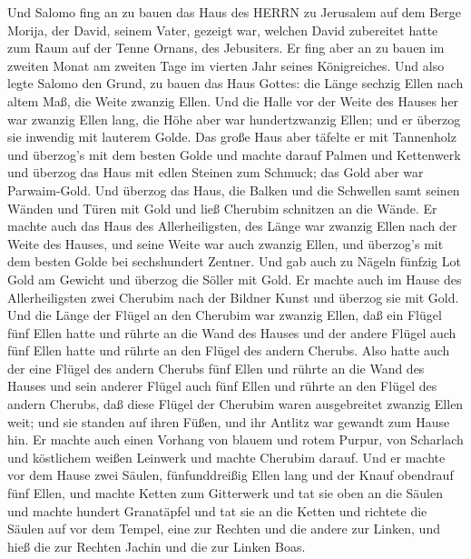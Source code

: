  Und Salomo fing an zu bauen das Haus des HERRN zu Jerusalem
auf dem Berge Morija, der David, seinem Vater, gezeigt war, welchen
David zubereitet hatte zum Raum auf der Tenne Ornans, des Jebusiters.
 Er fing aber an zu bauen im zweiten Monat am zweiten Tage
im vierten Jahr seines Königreiches.  Und also legte Salomo
den Grund, zu bauen das Haus Gottes: die Länge sechzig Ellen nach altem
Maß, die Weite zwanzig Ellen.  Und die Halle vor der Weite
des Hauses her war zwanzig Ellen lang, die Höhe aber war hundertzwanzig
Ellen; und er überzog sie inwendig mit lauterem Golde.  Das
große Haus aber täfelte er mit Tannenholz und überzog's mit dem besten
Golde und machte darauf Palmen und Kettenwerk  und überzog
das Haus mit edlen Steinen zum Schmuck; das Gold aber war Parwaim-Gold.
 Und überzog das Haus, die Balken und die Schwellen samt
seinen Wänden und Türen mit Gold und ließ Cherubim schnitzen an die
Wände.  Er machte auch das Haus des Allerheiligsten, des
Länge war zwanzig Ellen nach der Weite des Hauses, und seine Weite war
auch zwanzig Ellen, und überzog's mit dem besten Golde bei sechshundert
Zentner.  Und gab auch zu Nägeln fünfzig Lot Gold am Gewicht
und überzog die Söller mit Gold.  Er machte auch im Hause
des Allerheiligsten zwei Cherubim nach der Bildner Kunst und überzog sie
mit Gold.  Und die Länge der Flügel an den Cherubim war
zwanzig Ellen, daß ein Flügel fünf Ellen hatte und rührte an die Wand
des Hauses und der andere Flügel auch fünf Ellen hatte und rührte an den
Flügel des andern Cherubs.  Also hatte auch der eine Flügel
des andern Cherubs fünf Ellen und rührte an die Wand des Hauses und sein
anderer Flügel auch fünf Ellen und rührte an den Flügel des andern
Cherubs,  daß diese Flügel der Cherubim waren ausgebreitet
zwanzig Ellen weit; und sie standen auf ihren Füßen, und ihr Antlitz war
gewandt zum Hause hin.  Er machte auch einen Vorhang von
blauem und rotem Purpur, von Scharlach und köstlichem weißen Leinwerk
und machte Cherubim darauf.  Und er machte vor dem Hause
zwei Säulen, fünfunddreißig Ellen lang und der Knauf obendrauf fünf
Ellen,  und machte Ketten zum Gitterwerk und tat sie oben
an die Säulen und machte hundert Granatäpfel und tat sie an die Ketten
 und richtete die Säulen auf vor dem Tempel, eine zur
Rechten und die andere zur Linken, und hieß die zur Rechten Jachin und
die zur Linken Boas.

